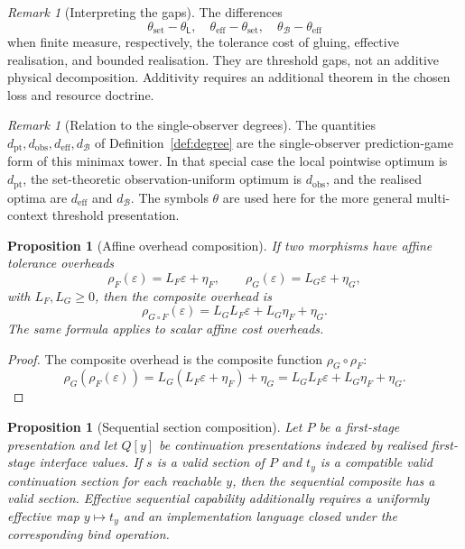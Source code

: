 \documentclass[11pt]{article}
\theoremstyle{plain}
\newtheorem{proposition}[theorem]{Proposition}
\theoremstyle{definition}
\theoremstyle{remark}
\newtheorem{remark}[theorem]{Remark}
\newcommand{\eps}{\varepsilon}
\begin{document}
\begin{remark}[Interpreting the gaps]
The differences
\[
\theta_{\mathrm{set}}-\theta_{\mathsf L},\quad
\theta_{\mathrm{eff}}-\theta_{\mathrm{set}},\quad
\theta_{\mathcal B}-\theta_{\mathrm{eff}}
\]
when finite measure, respectively, the tolerance cost of gluing, effective
realisation, and bounded realisation. They are threshold gaps, not an additive
physical decomposition. Additivity requires an additional theorem in the chosen
loss and resource doctrine.
\end{remark}

\begin{remark}[Relation to the single-observer degrees]
The quantities $d_{\mathrm{pt}},d_{\mathrm{obs}},d_{\mathrm{eff}},d_{\mathcal B}$
of Definition~\ref{def:degree} are the single-observer prediction-game form of
this minimax tower. In that special case the local pointwise optimum is
$d_{\mathrm{pt}}$, the set-theoretic observation-uniform optimum is
$d_{\mathrm{obs}}$, and the realised optima are $d_{\mathrm{eff}}$ and
$d_{\mathcal B}$. The symbols $\theta$ are used here for the more general
multi-context threshold presentation.
\end{remark}

\begin{proposition}[Affine overhead composition]
\label{prop:affine-overhead-composition}
If two morphisms have affine tolerance overheads
\[
\rho_F(\eps)=L_F\eps+\eta_F,
\qquad
\rho_G(\eps)=L_G\eps+\eta_G,
\]
with $L_F,L_G\ge0$, then the composite overhead is
\[
\rho_{G\circ F}(\eps)=L_GL_F\eps+L_G\eta_F+\eta_G.
\]
The same formula applies to scalar affine cost overheads.
\end{proposition}

\begin{proof}
The composite overhead is the composite function
$\rho_G\circ\rho_F$:
\[
\rho_G(\rho_F(\eps))=L_G(L_F\eps+\eta_F)+\eta_G
=L_GL_F\eps+L_G\eta_F+\eta_G.
\]
\end{proof}

\begin{proposition}[Sequential section composition]
\label{prop:sequential-composition-monograph}
Let $P$ be a first-stage presentation and let $Q[y]$ be continuation
presentations indexed by realised first-stage interface values. If $s$ is a valid
section of $P$ and $t_y$ is a compatible valid continuation section for each
reachable $y$, then the sequential composite has a valid section. Effective
sequential capability additionally requires a uniformly effective map
$y\mapsto t_y$ and an implementation language closed under the corresponding
bind operation.
\end{proposition}
\end{document}
